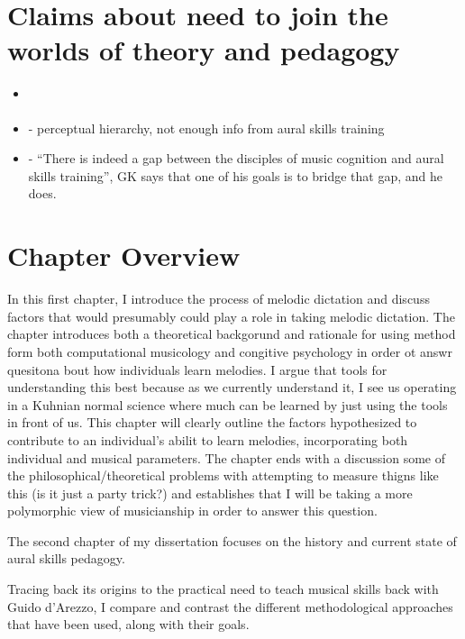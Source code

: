 \documentclass[]{book}
\providecommand{\tightlist}{%
  \setlength{\itemsep}{0pt}\setlength{\parskip}{0pt}}
\begin{document}
\hypertarget{claims-about-need-to-join-the-worlds-of-theory-and-pedagogy}{%
\section{Claims about need to join the worlds of theory and pedagogy}\label{claims-about-need-to-join-the-worlds-of-theory-and-pedagogy}}

\begin{itemize}
\tightlist
\item
  \citep{davidbutlerWhyGulfMusic1997a}
\item
  \citep{klonoskiPerceptualLearningHierarchy2000} - perceptual hierarchy, not enough info from aural skills training
\item
  \citep{karpinskiAuralSkillsAcquisition2000} - ``There is indeed a gap between the disciples of music cognition and aural skills training'', GK says that one of his goals is to bridge that gap, and he does.
\end{itemize}

\hypertarget{chapter-overview}{%
\section{Chapter Overview}\label{chapter-overview}}

In this first chapter, I introduce the process of melodic dictation and discuss factors that would presumably could play a role in taking melodic dictation.
The chapter introduces both a theoretical backgorund and rationale for using method form both computational musicology and congitive psychology in order ot answr quesitona bout how individuals learn melodies.
I argue that tools for understanding this best because as we currently understand it, I see us operating in a Kuhnian normal science where much can be learned by just using the tools in front of us.
This chapter will clearly outline the factors hypothesized to contribute to an individual's abilit to learn melodies, incorporating both individual and musical parameters.
The chapter ends with a discussion some of the philosophical/theoretical problems with attempting to measure thigns like this (is it just a party trick?) and establishes that I will be taking a more polymorphic view of musicianship in order to answer this question.

The second chapter of my dissertation focuses on the history and current state of aural skills pedagogy.

Tracing back its origins to the practical need to teach musical skills back with Guido d'Arezzo, I compare
and contrast the different methodological approaches that have been used, along with their goals.
\end{document}
